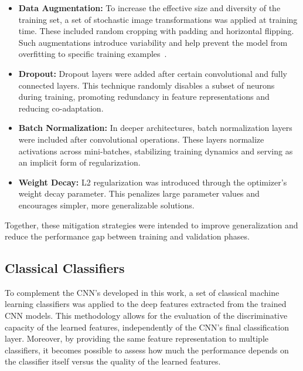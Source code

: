 \documentclass[journal,article,submit,pdftex,moreauthors]{Definitions/mdpi}
\begin{document}
\begin{itemize}
    \item \textbf{Data Augmentation:} To increase the effective size and diversity of the training set, a set of stochastic image transformations was applied at training time. These included random cropping with padding and horizontal flipping. Such augmentations introduce variability and help prevent the model from overfitting to specific training examples~\cite{shorten2019}.

    \item \textbf{Dropout:} Dropout layers were added after certain convolutional and fully connected layers. This technique randomly disables a subset of neurons during training, promoting redundancy in feature representations and reducing co-adaptation.

    \item \textbf{Batch Normalization:} In deeper architectures, batch normalization layers were included after convolutional operations. These layers normalize activations across mini-batches, stabilizing training dynamics and serving as an implicit form of regularization.

    \item \textbf{Weight Decay:} L2 regularization was introduced through the optimizer's weight decay parameter. This penalizes large parameter values and encourages simpler, more generalizable solutions.
\end{itemize}

Together, these mitigation strategies were intended to improve generalization and reduce the performance gap between training and validation phases.




\subsection{Classical Classifiers}
\label{sec:classical_classifiers}


To complement the CNN's developed in this work, a set of classical machine learning classifiers was applied to the deep features extracted from the trained CNN models. This methodology allows for the evaluation of the discriminative capacity of the learned features, independently of the CNN’s final classification layer. Moreover, by providing the same feature representation to multiple classifiers, it becomes possible to assess how much the performance depends on the classifier itself versus the quality of the learned features.
\end{document}
